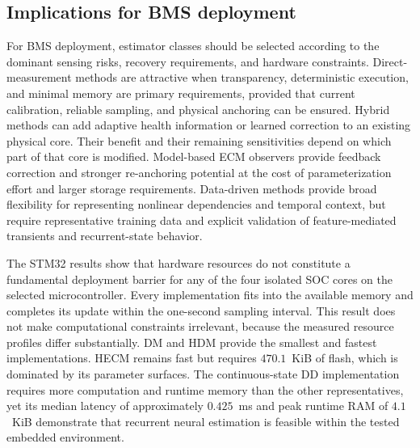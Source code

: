 \documentclass[review,nopreprintline]{elsarticle}
\begin{document}
\subsection{Implications for BMS deployment}
For BMS deployment, estimator classes should be selected according to the dominant sensing risks, recovery requirements, and hardware constraints. Direct-measurement methods are attractive when transparency, deterministic execution, and minimal memory are primary requirements, provided that current calibration, reliable sampling, and physical anchoring can be ensured. Hybrid methods can add adaptive health information or learned correction to an existing physical core. Their benefit and their remaining sensitivities depend on which part of that core is modified. Model-based ECM observers provide feedback correction and stronger re-anchoring potential at the cost of parameterization effort and larger storage requirements. Data-driven methods provide broad flexibility for representing nonlinear dependencies and temporal context, but require representative training data and explicit validation of feature-mediated transients and recurrent-state behavior.

The STM32 results show that hardware resources do not constitute a fundamental deployment barrier for any of the four isolated SOC cores on the selected microcontroller. Every implementation fits into the available memory and completes its update within the one-second sampling interval. This result does not make computational constraints irrelevant, because the measured resource profiles differ substantially. DM and HDM provide the smallest and fastest implementations. HECM remains fast but requires $470.1$~KiB of flash, which is dominated by its parameter surfaces. The continuous-state DD implementation requires more computation and runtime memory than the other representatives, yet its median latency of approximately $0.425$~ms and peak runtime RAM of $4.1$~KiB demonstrate that recurrent neural estimation is feasible within the tested embedded environment.
\end{document}
